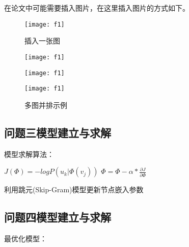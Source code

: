 \documentclass[withoutpreface,bwprint]{cumcmthesis}
\begin{document}
在论文中可能需要插入图片，在这里插入图片的方式如下。
\begin{figure}[htbp] 
    \centering 
    \texttt{[image: f1]}
    \caption{插入一张图}
    \label{fig.1}
  \end{figure}
\begin{figure}[htbp]
    \centering
    \begin{minipage}[c]{0.3\textwidth}
        \centering
        \texttt{[image: f1]}
        \label{fig:sample-figure-a}
    \end{minipage}
    \begin{minipage}[c]{0.3\textwidth}
        \centering
        \texttt{[image: f1]}
        \label{fig:sample-figure-b}
    \end{minipage}
    \begin{minipage}[c]{0.3\textwidth}
        \centering
        \texttt{[image: f1]}
        \label{fig:sample-figure-c}
    \end{minipage}
    \caption{多图并排示例}
    \label{fig:sample-figure}
\end{figure}

\subsection{问题三模型建立与求解}

模型求解算法：

\begin{algorithm}[H]
    \renewcommand{\thealgocf}{3}     %
    \SetAlgoLined
   
    
    {
     {
      $J(\Phi) = - log P\left( u_k | \Phi  ( v_j) \right)$ \;
      $\Phi = \Phi - \alpha * \frac{\partial J}{\partial \Phi }$ \;
  
     }
    }  
    \caption{利用跳元(Skip-Gram)模型更新节点嵌入参数}
   \end{algorithm}
\subsection{问题四模型建立与求解}

最优化模型：
\end{document}
